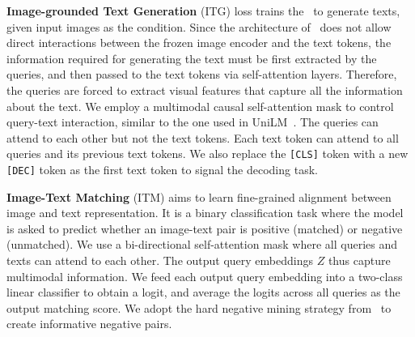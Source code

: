 \noindent\textbf{Image-grounded Text Generation} (ITG) loss trains the \name~to generate texts, given input images as the condition.
Since the architecture of \name~does not allow direct interactions between the frozen image encoder and the text tokens,
the information required for generating the text must be first extracted by the queries,
and then passed to the text tokens via self-attention layers.
Therefore, the queries are forced to extract visual features that capture all the information about the text. 
We employ a multimodal causal self-attention mask to control query-text interaction, similar to the one used in UniLM~\cite{UniLM}.
The queries can attend to each other but not the text tokens.
Each text token can attend to all queries and its previous text tokens.
We also replace the \texttt{[CLS]} token with a new \texttt{[DEC]} token as the first text token to signal the decoding task.


\noindent\textbf{Image-Text Matching} (ITM)
aims to learn fine-grained alignment between image and text representation.
It is a binary classification task where the model is asked to predict whether an image-text pair is positive
(matched) or negative (unmatched).
We use a bi-directional self-attention mask where all queries and texts can attend to each other.
The output query embeddings $Z$ thus capture multimodal information.
We feed each output query embedding into a two-class linear classifier to obtain a logit,
and average the logits across all queries as the output matching score.
We adopt the hard negative mining strategy from~\citet{ALBEF,blip} to create informative negative pairs.





\vspace{-0.5ex}
